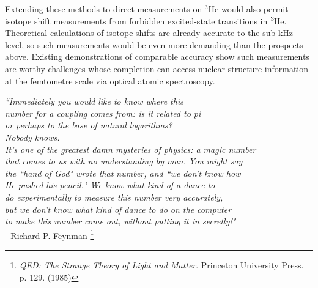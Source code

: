 	Extending these methods to direct measurements on $^3$He would also permit isotope shift measurements from forbidden excited-state transitions in $^{3\!}$He.
	Theoretical calculations of isotope shifts are already accurate to the sub-kHz level, so such measurements would be even more demanding than the prospects above.
	Existing demonstrations of comparable accuracy \cite{Rengelink18} show such measurements are worthy challenges whose completion can access nuclear structure information at the femtometre scale via optical atomic spectroscopy.


\vfill

\begin{flushright}
\singlespacing
\emph{
``Immediately you would like to know where this \\
number for a coupling comes from: is it related to pi\\
or perhaps to the base of natural logarithms? \\
Nobody knows.\\
It's one of the greatest damn mysteries of physics: a magic number \\
that comes to us with no understanding by man. You might say \\
the ``hand of God" wrote that number, and ``we don't know how\\
He pushed his pencil." We know what kind of a dance to\\
do experimentally to measure this number very accurately,\\
but we don't know what kind of dance to do on the computer\\
to make this number come out, without putting it in secretly!"}\\
- Richard P.
Feynman \footnote{\emph{QED: The Strange Theory of Light and Matter}.
	Princeton University Press.	p.	129.	(1985)}
\end{flushright}
\onehalfspacing
